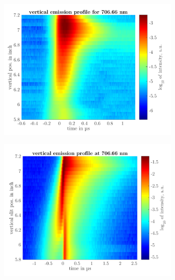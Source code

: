 \documentclass[a4paper,10pt]{article}
\begin{document}
				\begin{figure}[h]
					
					\centering
					
					\begin{subfigure}[t]{0.49\textwidth}
						\includegraphics[width=\textwidth]{figures/results/spatialtemporalresolvedlineintensity/sine/706nm.pdf}
						\label{img:706sine}
					     \vspace{-0.5cm}\caption{}
					\end{subfigure}
					\hfill
					\begin{subfigure}[t]{0.49\textwidth}
						\includegraphics[width=\textwidth]{figures/results/spatialtemporalresolvedlineintensity/square/korr706nm.pdf}
						\label{img:706square}
						\vspace{-0.5cm}\caption{}
					\end{subfigure}
					

\end{figure}
\end{document}
